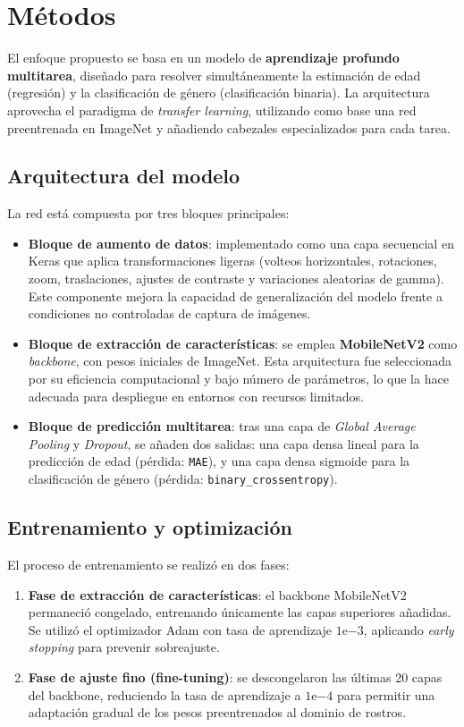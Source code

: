 \section{Métodos}

El enfoque propuesto se basa en un modelo de \textbf{aprendizaje profundo multitarea}, diseñado para resolver simultáneamente la estimación de edad (regresión) y la clasificación de género (clasificación binaria). La arquitectura aprovecha el paradigma de \textit{transfer learning}, utilizando como base una red preentrenada en ImageNet y añadiendo cabezales especializados para cada tarea.

\subsection{Arquitectura del modelo}
La red está compuesta por tres bloques principales:
\begin{itemize}
  \item \textbf{Bloque de aumento de datos}: implementado como una capa secuencial en Keras que aplica transformaciones ligeras (volteos horizontales, rotaciones, zoom, traslaciones, ajustes de contraste y variaciones aleatorias de gamma). Este componente mejora la capacidad de generalización del modelo frente a condiciones no controladas de captura de imágenes.
  \item \textbf{Bloque de extracción de características}: se emplea \textbf{MobileNetV2} como \textit{backbone}, con pesos iniciales de ImageNet. Esta arquitectura fue seleccionada por su eficiencia computacional y bajo número de parámetros, lo que la hace adecuada para despliegue en entornos con recursos limitados.
  \item \textbf{Bloque de predicción multitarea}: tras una capa de \textit{Global Average Pooling} y \textit{Dropout}, se añaden dos salidas: una capa densa lineal para la predicción de edad (pérdida: \texttt{MAE}), y una capa densa sigmoide para la clasificación de género (pérdida: \texttt{binary\_crossentropy}).
\end{itemize}

\subsection{Entrenamiento y optimización}
El proceso de entrenamiento se realizó en dos fases:
\begin{enumerate}
  \item \textbf{Fase de extracción de características}: el backbone MobileNetV2 permaneció congelado, entrenando únicamente las capas superiores añadidas. Se utilizó el optimizador Adam con tasa de aprendizaje $1\mathrm{e}{-3}$, aplicando \textit{early stopping} para prevenir sobreajuste.
  \item \textbf{Fase de ajuste fino (fine-tuning)}: se descongelaron las últimas 20 capas del backbone, reduciendo la tasa de aprendizaje a $1\mathrm{e}{-4}$ para permitir una adaptación gradual de los pesos preentrenados al dominio de rostros.
\end{enumerate}

